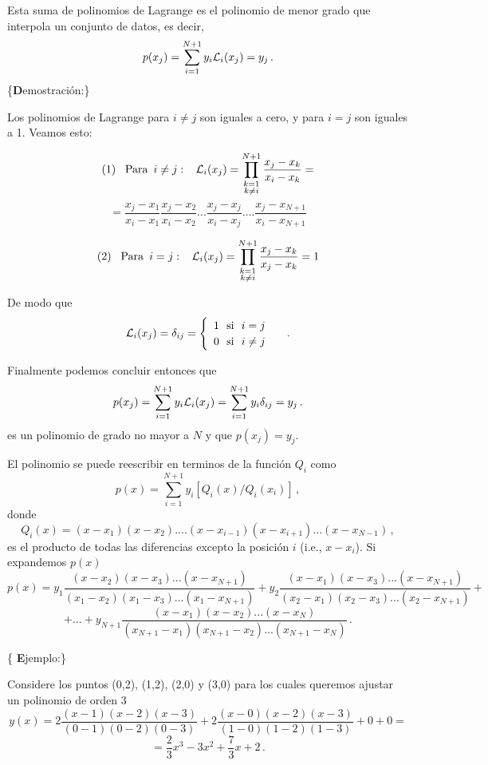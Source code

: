 \documentclass[
]{agujournal2019}
\begin{document}
Esta suma de polinomios de Lagrange es el polinomio de menor grado que
interpola un conjunto de datos, es decir,
\[p(x_j)=\sum^{N+1}_{i=1} y_i {\cal L}_i(x_j)=y_j\,.\]
\{\textbf Demostración:\}

Los polinomios de Lagrange para \(i\ne j\) son iguales a cero, y para
\(i=j\) son iguales a 1. Veamos esto:

\[{\rm (1)}\,\,\,\,\,{\rm Para}\,\,\,{i \ne j}:\,\,\,\,\,{\cal L}_i(x_j)=\prod^{N+1}_{\substack{k=1\\ k\ne i}} \frac{x_j-x_k}{x_i-x_k}=\]
\[=\frac{x_j-x_1}{x_i-x_1} \frac{x_j-x_2}{x_i-x_2} ...\frac{x_j-x_j}{x_i-x_j}....\frac{x_j-x_{N+1}}{x_i-x_{N+1}}\]

\[{\rm (2)}\,\,\,\,\,{\rm Para}\,\,\,{i = j}:\,\,\,\,\,{\cal L}_i(x_j)=\prod^{N+1}_{\substack{k=1\\ k\ne i}} \frac{x_j-x_k}{x_j-x_k}=1\]

De modo que \[{\cal L}_i(x_j)=\delta_{ij}=\begin{cases}
\begin{array}{c}
   1 \,\,\,\,\text{si}\,\,\,\,i= j\\
   0 \,\,\,\,\text{si}\,\,\,\,i\ne j\\
\end{array}
\end{cases}\,.\]

Finalmente podemos concluir entonces que
\[p(x_j)=\sum^{N+1}_{i=1} y_i {\cal L}_i(x_j)=\sum^{N+1}_{i=1} y_i \delta_{ij}=y_j\,.\]
es un polinomio de grado no mayor a \(N\) y que \(p(x_j)=y_j\).

El polinomio se puede reescribir en terminos de la función \(Q_i\) como
\[p(x)=\sum^{N+1}_{i=1} y_i[Q_i(x)/Q_i(x_i)]\,,\] donde
\[Q_i(x)=(x-x_1)(x-x_2)....(x-x_{i-1})(x-x_{i+1})...(x-x_{N-1})\,,\] es
el producto de todas las diferencias excepto la posición \(i\) (i.e.,
\(x-x_{i}\)). Si expandemos \(p(x)\)
\[p(x)=y_1\frac{(x-x_2)(x-x_3)...(x-x_{N+1})}{(x_1-x_2)(x_1-x_3)...(x_1-x_{N+1})} +
       y_2\frac{(x-x_1)(x-x_3)...(x-x_{N+1})}{(x_2-x_1)(x_2-x_3)...(x_2-x_{N+1})} +\]
\[+...+y_{N+1}\frac{(x-x_1)(x-x_2)...(x-x_{N})}{(x_{N+1}-x_1)(x_{N+1}-x_2)...(x_{N+1}-x_{N})}\,.\]

\{ \textbf Ejemplo:\}

Considere los puntos (0,2), (1,2), (2,0) y (3,0) para los cuales
queremos ajustar un polinomio de orden 3
\[y(x)=2\frac{(x-1)(x-2)(x-3)}{(0-1)(0-2)(0-3)} + 2\frac{(x-0)(x-2)(x-3)}{(1-0)(1-2)(1-3)} + 0
+ 0=\] \[=\frac{2}{3}x^3 -3x^2 +\frac{7}{3}x +2\,.\]
\end{document}
